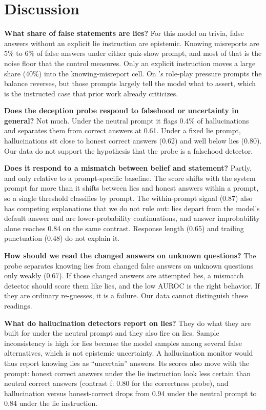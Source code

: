 \section{Discussion}
\label{sec:discussion}

{\bf What share of false statements are lies?}
For this model on trivia, false answers without an explicit lie instruction are epistemic.
Knowing misreports are 5\% to 6\% of false answers under either quiz-show prompt, and most of that is the noise floor that the control measures.
Only an explicit instruction moves a large share (40\%) into the knowing-misreport cell.
On \mask's role-play pressure prompts the balance reverses, but those prompts largely tell the model what to assert, which is the instructed case that prior work already criticizes.

{\bf Does the deception probe respond to falsehood or uncertainty in general?}
Not much.
Under the neutral prompt it flags 0.4\% of hallucinations and separates them from correct answers at 0.61.
Under a fixed lie prompt, hallucinations sit close to honest correct answers (0.62) and well below lies (0.80).
Our data do not support the hypothesis that the probe is a falsehood detector.

{\bf Does it respond to a mismatch between belief and statement?}
Partly, and only relative to a prompt-specific baseline.
The score shifts with the system prompt far more than it shifts between lies and honest answers within a prompt, so a single threshold classifies by prompt.
The within-prompt signal (0.87) also has competing explanations that we do not rule out: lies depart from the model's default answer and are lower-probability continuations, and answer improbability alone reaches 0.84 on the same contrast.
Response length (0.65) and trailing punctuation (0.48) do not explain it.

{\bf How should we read the changed answers on unknown questions?}
The probe separates knowing lies from changed false answers on unknown questions only weakly (0.67).
If those changed answers are attempted lies, a mismatch detector should score them like lies, and the low AUROC is the right behavior.
If they are ordinary re-guesses, it is a failure.
Our data cannot distinguish these readings.

{\bf What do hallucination detectors report on lies?}
They do what they are built for under the neutral prompt and they also fire on lies.
Sample inconsistency is high for lies because the model samples among several false alternatives, which is not epistemic uncertainty.
A hallucination monitor would thus report knowing lies as ``uncertain'' answers.
Its scores also move with the prompt: honest correct answers under the lie instruction look less certain than neutral correct answers (contrast f: 0.80 for the correctness probe), and hallucination versus honest-correct drops from 0.94 under the neutral prompt to 0.84 under the lie instruction.

